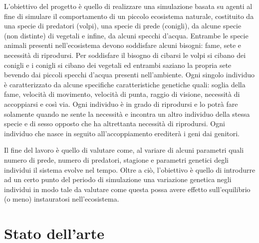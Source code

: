\documentclass[11pt]{article}
\begin{document}
L'obiettivo del progetto è quello di realizzare una simulazione basata su agenti al fine di simulare il comportamento di un piccolo ecosistema naturale, costituito da una specie di predatori (volpi), una specie di prede (conigli), da alcune specie (non distinte) di vegetali e infine, da alcuni specchi d'acqua. Entrambe le specie animali presenti nell'ecosistema devono soddisfare alcuni bisogni: fame, sete e necessità di riprodursi. Per soddisfare il bisogno di cibarsi le volpi si cibano dei conigli e i conigli si cibano dei vegetali ed entrambi saziano la propria sete bevendo dai piccoli specchi d'acqua presenti nell'ambiente. Ogni singolo individuo è caratterizzato da alcune specifiche caratteristiche genetiche quali: soglia della fame, velocità di movimento, velocità di punta, raggio di visione, necessità di accoppiarsi e così via. Ogni individuo è in grado di riprodursi e lo potrà fare solamente quando ne sente la necessità e incontra un altro individuo della stessa specie e di sesso opposto che ha altrettanta necessità di riprodursi. Ogni individuo che nasce in seguito all'accoppiamento erediterà i geni dai genitori.  

Il fine del lavoro è quello di valutare come, al variare di alcuni parametri quali numero di prede, numero di predatori, stagione e parametri genetici degli individui il sistema evolve nel tempo. Oltre a ciò, l'obiettivo è quello di introdurre ad un certo punto del periodo di simulazione una variazione genetica negli individui in modo tale da valutare come questa possa avere effetto sull'equilibrio (o meno) instauratosi nell'ecosistema. 


\newpage

\section{Stato dell'arte}
\end{document}
